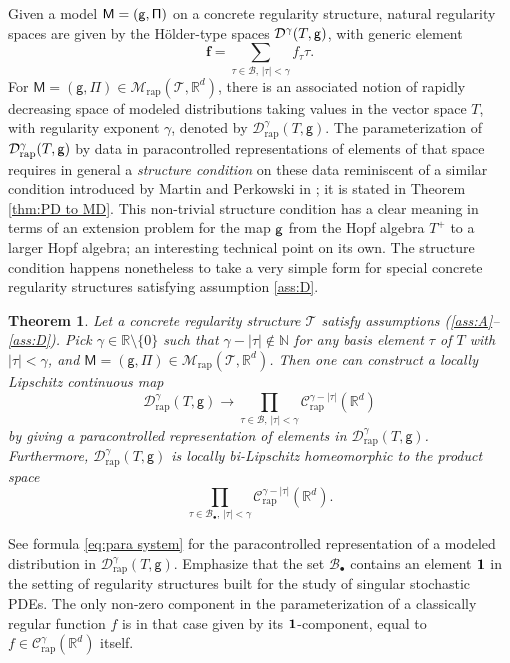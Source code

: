 \documentclass[JEP,XML,SOM,Unicode,published]{cedram}
\newcommand{\sbullet}{{\scriptscriptstyle\bullet}}
\theoremstyle{plain}
\newtheorem{thm}{Theorem}
\theoremstyle{definition}
\newcommand{\bsf}{\boldsymbol{f}}
\newcommand{\rap}{\mathrm{rap}}
\newcommand{\sfM}{\mathsf{M}}
\newcommand{\sfg}{\mathsf{g}}
\newcommand{\sfPi}{\mathsf{\Pi}}
\newcommand{\scrM}{\mathscr{M}}
\newcommand{\scrT}{\mathscr{T}}
\newcommand{\bbN}{\mathbb{N}}
\newcommand{\bbR}{\mathbb{R}}
\newcommand{\mcB}{\mathcal{B}}
\newcommand{\mcC}{\mathcal{C}}
\newcommand{\mcD}{\mathcal{D}}
\begin{document}
Given a model $\sf M=(g,\Pi)$ on a concrete regularity structure, natural regularity spaces are given by the Hölder-type spaces $\mcD^\gamma(T,\sf g)$, with generic element
\[
\bsf = \sum_{\tau\in\mcB,\, \vert\tau\vert < \gamma} f_\tau \tau.
\]
For $\sfM=(\sfg,\sfPi)\in\scrM_\rap(\scrT, \bbR^d)$, there is an associated notion of rapidly decreasing space of modeled distributions taking values in the vector space $T$, with regularity exponent $\gamma$, denoted by $\mcD_\rap^\gamma(T, \sfg)$. The parameterization of $\mcD_\rap^\gamma(T,\sf g)$ by data in paracontrolled representations of elements of that space requires in general a {\it structure condition} on these data reminiscent of a similar condition introduced by Martin and Perkowski in \cite{MP18}; it is stated in Theorem \ref{thm:PD to MD}. This non-trivial structure condition has a clear meaning in terms of an extension problem for the map $\sf g$ from the Hopf algebra $T^+$ to a larger Hopf algebra; an interesting technical point on its own. The structure condition happens nonetheless to take a very simple form for special concrete regularity structures satisfying assumption \eqref{ass:D}.

\begin{thm} \label{mainthm2}
Let a concrete regularity structure $\scrT$ satisfy assumptions \textup{(\ref{ass:A}--\ref{ass:D})}. Pick $\gamma\in\bbR\setminus\{0\}$ such that $\gamma-|\tau|\notin\bbN$ for any basis element $\tau$ of $T$ with $|\tau|<\gamma$, and $\sfM=(\sfg,\sfPi)\in\scrM_\rap(\scrT, \bbR^d)$. Then one can construct a locally Lipschitz continuous map\vspace*{-3pt}
\[
\mcD_\rap^\gamma(T,\sfg) \to \prod_{\tau\in\mcB,\, |\tau|<\gamma} \mcC_\rap^{\gamma-|\tau|}(\bbR^d)
\]
by giving a paracontrolled representation of elements in $\mcD_\rap^\gamma(T,\sfg)$. Furthermore, $\mcD_\rap^\gamma(T, \sfg)$ is locally bi-Lipschitz homeomorphic to the product space\vspace*{-3pt}\enlargethispage{.5\baselineskip}%
\[
\prod_{\tau\in\mcB_\sbullet,\, |\tau|<\gamma} \mcC_\rap^{\gamma-|\tau|}(\bbR^d).
\]
\end{thm}

See formula \eqref{eq:para system} for the paracontrolled representation of a modeled distribution in $\mcD_\rap^\gamma(T,\sfg)$. Emphasize that the set $\mcB_\sbullet$ contains an element $\bf 1$ in the setting of regularity structures built for the study of singular stochastic PDEs. The only non-zero component in the parameterization of a classically regular function $f$ is in that case given by its $\bf 1$-component, equal to $f\in\mcC^\gamma_\rap(\bbR^d)$ itself.
\end{document}
